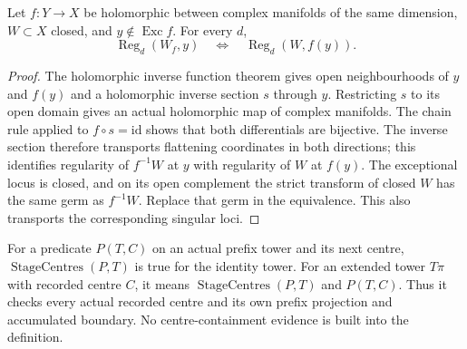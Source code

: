 \begin{lemma}
\label{hir:stage-regularity-unramified}
\leanok
Let $f:Y\to X$ be holomorphic between complex manifolds of the same dimension,
$W\subset X$ closed, and $y\notin\operatorname{Exc}f$. For every $d$,
\[
 \operatorname{Reg}_d(W_f,y)\quad\Longleftrightarrow\quad
 \operatorname{Reg}_d(W,f(y)).
\]
\end{lemma}
\begin{proof}
The holomorphic inverse function theorem gives open neighbourhoods of $y$
and $f(y)$ and a holomorphic inverse section $s$ through $y$. Restricting $s$
to its open domain gives an actual holomorphic map of complex manifolds.
The chain rule applied to $f\circ s=\mathrm{id}$ shows that both
differentials are bijective. The inverse section therefore transports
flattening coordinates in both directions; this identifies regularity of
$f^{-1}W$ at $y$ with regularity of $W$ at $f(y)$.
The exceptional locus is closed, and on its open complement the strict
transform of closed $W$ has the same germ as $f^{-1}W$. Replace that germ in
the equivalence. This also transports the corresponding singular loci.
\end{proof}

\begin{definition}
\label{hir:recorded-stage-centres}
\leanok
For a predicate $P(T,C)$ on an actual prefix tower and its next centre,
$\operatorname{StageCentres}(P,T)$ is true for the identity tower. For an
extended tower $T\pi$ with recorded centre $C$, it means
$\operatorname{StageCentres}(P,T)$ and $P(T,C)$. Thus it checks every actual
recorded centre and its own prefix projection and accumulated boundary.
No centre-containment evidence is built into the definition.
\end{definition}

